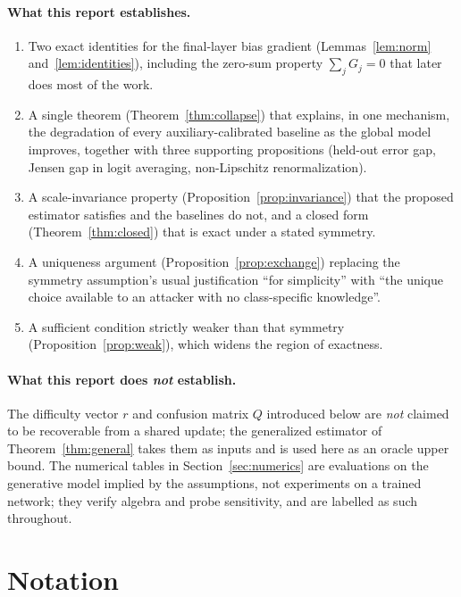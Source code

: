 \documentclass[11pt]{article}
\theoremstyle{remark}
\begin{document}
\paragraph{What this report establishes.}
\begin{enumerate}
\item Two exact identities for the final-layer bias gradient
  (Lemmas~\ref{lem:norm} and~\ref{lem:identities}), including the
  zero-sum property $\sum_j G_j = 0$ that later does most of the work.
\item A single theorem (Theorem~\ref{thm:collapse}) that explains, in one
  mechanism, the degradation of every auxiliary-calibrated baseline as the
  global model improves, together with three supporting propositions
  (held-out error gap, Jensen gap in logit averaging, non-Lipschitz
  renormalization).
\item A scale-invariance property (Proposition~\ref{prop:invariance}) that
  the proposed estimator satisfies and the baselines do not, and a closed
  form (Theorem~\ref{thm:closed}) that is exact under a stated symmetry.
\item A uniqueness argument (Proposition~\ref{prop:exchange}) replacing the
  symmetry assumption's usual justification ``for simplicity'' with
  ``the unique choice available to an attacker with no class-specific
  knowledge''.
\item A sufficient condition strictly weaker than that symmetry
  (Proposition~\ref{prop:weak}), which widens the region of exactness.
\end{enumerate}

\paragraph{What this report does \emph{not} establish.}
The difficulty vector $r$ and confusion matrix $Q$ introduced below are
\emph{not} claimed to be recoverable from a shared update; the generalized
estimator of Theorem~\ref{thm:general} takes them as inputs and is used here
as an oracle upper bound. The numerical tables in
Section~\ref{sec:numerics} are evaluations on the generative model implied by
the assumptions, not experiments on a trained network; they verify algebra
and probe sensitivity, and are labelled as such throughout.

\section{Notation}
\label{sec:notation}
\end{document}
